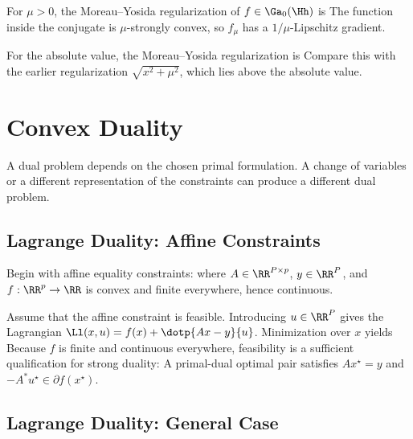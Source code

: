 For $\mu>0$, the Moreau--Yosida regularization of $f\in\Ga_0(\Hh)$ is
The function inside the conjugate is $\mu$-strongly convex, so $f_\mu$ has a $1/\mu$-Lipschitz gradient.

For the absolute value, the Moreau--Yosida regularization is
Compare this with the earlier regularization $\sqrt{x^2+\mu^2}$, which lies above the absolute value.



\section{Convex Duality}
\label{sec-cvx-duality}

A dual problem depends on the chosen primal formulation. A change of variables or a different representation of the constraints can produce a different dual problem.

\subsection{Lagrange Duality: Affine Constraints}

Begin with affine equality constraints:
where $A\in\RR^{P\times p}$, $y\in\RR^P$, and $f : \RR^p \rightarrow \RR$ is convex and finite everywhere, hence continuous.

Assume that the affine constraint is feasible. Introducing $u\in\RR^P$ gives the Lagrangian $\Ll(x,u)=f(x)+\dotp{Ax-y}{u}$. Minimization over $x$ yields
Because $f$ is finite and continuous everywhere, feasibility is a sufficient qualification for strong duality:
A primal-dual optimal pair satisfies $Ax^\star=y$ and $-A^*u^\star\in\partial f(x^\star)$.

\subsection{Lagrange Duality: General Case}

